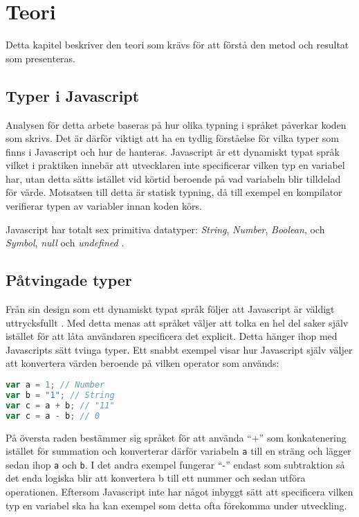 \section{Teori}
\label{sec:alexander-theory}

Detta kapitel beskriver den teori som krävs för att förstå den metod och resultat som presenteras.

\subsection{Typer i Javascript}

Analysen för detta arbete baseras på hur olika typning i språket påverkar koden som skrivs. Det är därför viktigt att ha en tydlig förståelse för vilka typer som finns i Javascript och hur de hanteras. Javascript är ett dynamiskt typat språk vilket i praktiken innebär att utvecklaren inte specificerar vilken typ en variabel har, utan detta sätts istället vid körtid beroende på vad variabeln blir tilldelad för värde. Motsatsen till detta är statisk typning, då till exempel en kompilator verifierar typen av variabler innan koden körs.

Javascript har totalt sex primitiva datatyper: \textit{String}, \textit{Number}, \textit{Boolean}, och \textit{Symbol}, \textit{null} och \textit{undefined} \cite{javascript-primitives}.

\subsection{Påtvingade typer}

Från sin design som ett dynamiskt typat språk följer att Javascript är väldigt uttrycksfullt \cite{javascript-type-coersion}. Med detta menas att språket väljer att tolka en hel del saker själv istället för att låta användaren specificera det explicit. Detta hänger ihop med Javascripts sätt tvinga typer. Ett snabbt exempel visar hur Javascript själv väljer att konvertera värden beroende på vilken operator som används:

\begin{lstlisting}[language=JavaScript]
var a = 1; // Number
var b = "1"; // String
var c = a + b; // "11"
var c = a - b; // 0
\end{lstlisting}




På översta raden bestämmer sig språket för att använda ``+'' som konkatenering istället för summation och konverterar därför variabeln \texttt{a} till en sträng och lägger sedan ihop \texttt{a} och \texttt{b}. I det andra exempel fungerar ``-'' endast som subtraktion så det enda logiska blir att konvertera b till ett nummer och sedan utföra operationen. Eftersom Javascript inte har något inbyggt sätt att specificera vilken typ en variabel ska ha kan exempel som detta ofta förekomma under utveckling.

